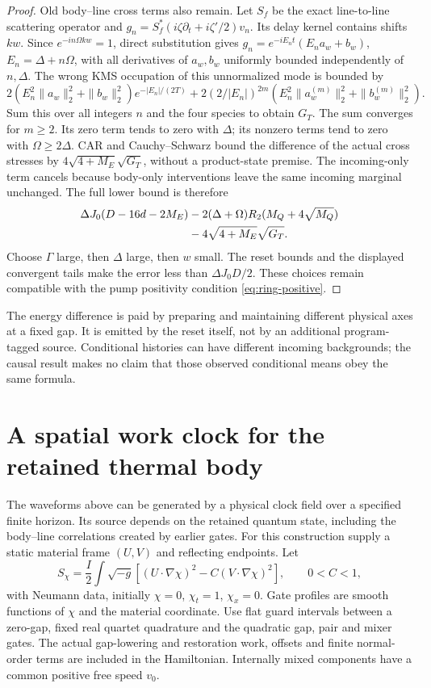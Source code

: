 \begin{proof}
Old body--line cross terms also remain. Let $S_f$ be the exact
line-to-line scattering operator and
$g_n=S_f^*(i\zeta\partial_t+i\zeta'/2)v_n$.
Its delay kernel contains shifts $kw$. Since
$e^{-in\Omega kw}=1$, direct substitution gives
$g_n=e^{-iE_nt}(E_na_w+b_w)$, $E_n=\Delta+n\Omega$, with all
derivatives of $a_w,b_w$ uniformly bounded independently of $n,\Delta$.
The wrong KMS occupation of this unnormalized mode is bounded by
\[
 2(E_n^2\|a_w\|_2^2+\|b_w\|_2^2)e^{-|E_n|/(2T)}
 +2(2/|E_n|)^{2m}(E_n^2\|a_w^{(m)}\|_2^2+\|b_w^{(m)}\|_2^2).
\]
Sum this over all integers $n$ and the four species to obtain $G_T$.
The sum converges for $m\ge2$. Its zero term tends to zero with
$\Delta$; its nonzero terms tend to zero with $\Omega\ge2\Delta$.
CAR and Cauchy--Schwarz bound the difference of the actual cross
stresses by $4\sqrt{4+M_E}\sqrt{G_T}$, without a product-state premise.
The incoming-only term cancels because body-only interventions leave
the same incoming marginal unchanged. The full lower bound is therefore
\begin{align}
 \Delta J_0(D-16d-2M_E)
 &-2(\Delta+\Omega)R_2(M_Q+4\sqrt{M_Q})\notag\\
 &-4\sqrt{4+M_E}\sqrt{G_T}.
\end{align}
Choose $\Gamma$ large, then $\Delta$ large, then $w$ small. The
reset bounds and the displayed convergent tails make the error less
than $\Delta J_0D/2$. These choices remain compatible with the pump
positivity condition \eqref{eq:ring-positive}.
\end{proof}

The energy difference is paid by preparing and maintaining different
physical axes at a fixed gap. It is emitted by the reset itself, not
by an additional program-tagged source. Conditional histories can
have different incoming backgrounds; the causal result makes no
claim that those observed conditional means obey the same formula.

\section{A spatial work clock for the retained thermal body}
\label{sec:physical-window-clock}

The waveforms above can be generated by a physical clock field over a
specified finite horizon. Its source depends on the retained quantum
state, including the body--line correlations created by earlier gates.
For this construction supply a static material frame $(U,V)$ and
reflecting endpoints. Let
\begin{equation}
 S_\chi=\frac I2\int\sqrt{-g}
 [(U\cdot\nabla\chi)^2-C(V\cdot\nabla\chi)^2],
 \qquad 0<C<1,
 \label{eq:work-clock-action}
\end{equation}
with Neumann data, initially $\chi=0$, $\chi_t=1$, $\chi_x=0$.
Gate profiles are smooth functions of $\chi$ and the material coordinate.
Use flat guard intervals between a zero-gap, fixed real quartet
quadrature and the quadratic gap, pair and mixer gates. The actual
gap-lowering and restoration work, offsets and finite normal-order
terms are included in the Hamiltonian. Internally mixed components
have a common positive free speed $v_0$.

